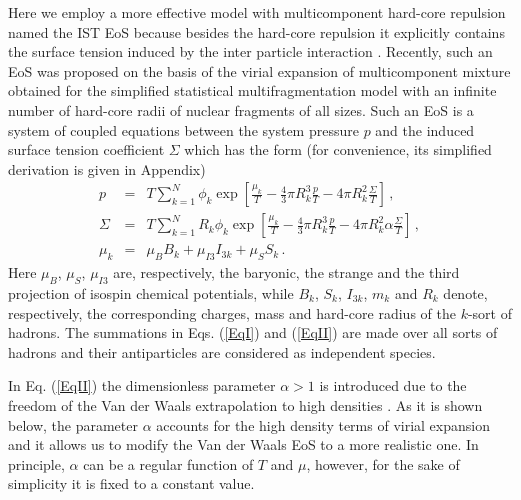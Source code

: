 \documentclass[12pt]{article}
\begin{document}
Here we employ a more effective model with multicomponent hard-core repulsion named the IST EoS
because besides the hard-core repulsion  it explicitly contains the surface tension induced by the inter particle interaction \cite{Bugaev:13NPA}.
Recently, such an EoS  was 
proposed on the basis of the virial expansion of  multicomponent mixture \cite{Bugaev:13NPA} obtained for the simplified  statistical multifragmentation model  \cite{Mekjian} with an infinite number of hard-core radii of nuclear fragments of all sizes. 
Such an EoS is a system of coupled  equations between the system pressure  $p$ and  the induced surface tension coefficient $\Sigma$ which has the form  \cite{Bugaev:2016,Bugaev:13NPA}  
(for convenience, its simplified derivation is given in Appendix)
%
\begin{eqnarray}
\label{EqI}
p &=& T \sum_{k=1}^N \phi_k \exp \left[ \frac{\mu_k}{T} - \frac{4}{3}\pi R_k^3 \frac{p}{T} - 4\pi R_k^2 \frac{\Sigma}{T} \right]
\,, \\
%
\label{EqII}
\Sigma &=& T \sum_{k=1}^N R_k \phi_k \exp \left[ \frac{\mu_k}{T} - \frac{4}{3}\pi R_k^3 \frac{p}{T} - 4\pi R_k^2 \alpha \frac{\Sigma}{T} \right] \,,\\
%
\label{EqIII}
\mu_k &=& \mu_B B_k + \mu_{I3} I_{3k} + \mu_S S_k \,.
\end{eqnarray}
%
Here $\mu_B$, $\mu_S$, $\mu_{I3}$ are, respectively, the baryonic,  the strange and the third projection of isospin  chemical potentials, while 
$B_k$, $S_k$, $I_{3k}$, $m_k$ and $R_k$ denote, respectively,  the corresponding charges,  mass and hard-core radius of the $k$-sort of hadrons. The summations in  Eqs. (\ref{EqI}) and (\ref{EqII})  are made over all sorts of hadrons and their antiparticles are 
considered as independent species. 

In Eq. (\ref{EqII}) the dimensionless  parameter $\alpha>1$ is introduced   due to the freedom of the Van der Waals extrapolation to high densities \cite{Bugaev:13NPA}.  As it is shown below,  the  parameter $\alpha$ accounts for the  high density terms of virial expansion  and it allows us to   modify  the  Van der Waals  EoS  to a more realistic one.
In principle, $\alpha$ can be a regular function of $T$ and $\mu$,   however, for the sake of simplicity it is fixed to a constant value. 
\end{document}
